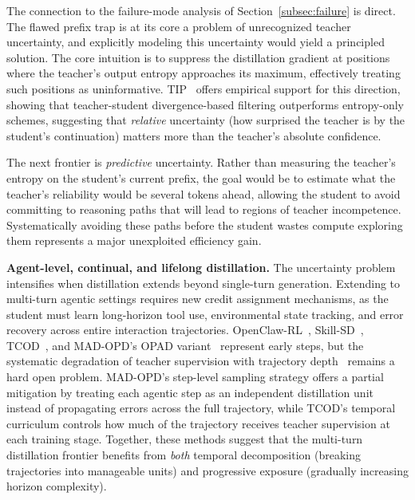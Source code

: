 \documentclass{article} %
\begin{document}
The connection to the failure-mode analysis of Section~\ref{subsec:failure} is direct. The flawed prefix trap is at its core a problem of unrecognized teacher uncertainty, and explicitly modeling this uncertainty would yield a principled solution. The core intuition is to suppress the distillation gradient at positions where the teacher's output entropy approaches its maximum, effectively treating such positions as uninformative. TIP~\citep{xu2026tip} offers empirical support for this direction, showing that teacher-student divergence-based filtering outperforms entropy-only schemes, suggesting that \emph{relative} uncertainty (how surprised the teacher is by the student's continuation) matters more than the teacher's absolute confidence.

The next frontier is \emph{predictive} uncertainty. Rather than measuring the teacher's entropy on the student's current prefix, the goal would be to estimate what the teacher's reliability would be several tokens ahead, allowing the student to avoid committing to reasoning paths that will lead to regions of teacher incompetence. Systematically avoiding these paths before the student wastes compute exploring them represents a major unexploited efficiency gain.

\textbf{Agent-level, continual, and lifelong distillation.} The uncertainty problem intensifies when distillation extends beyond single-turn generation. Extending to multi-turn agentic settings requires new credit assignment mechanisms, as the student must learn long-horizon tool use, environmental state tracking, and error recovery across entire interaction trajectories. OpenClaw-RL~\citep{wang2026openclawrl}, Skill-SD~\citep{wang2026skillsd}, TCOD~\citep{chen2026tcod}, and MAD-OPD's OPAD variant~\citep{wang2026madopd} represent early steps, but the systematic degradation of teacher supervision with trajectory depth~\citep{li2026rethinking} remains a hard open problem. MAD-OPD's step-level sampling strategy offers a partial mitigation by treating each agentic step as an independent distillation unit instead of propagating errors across the full trajectory, while TCOD's temporal curriculum controls how much of the trajectory receives teacher supervision at each training stage. Together, these methods suggest that the multi-turn distillation frontier benefits from \emph{both} temporal decomposition (breaking trajectories into manageable units) and progressive exposure (gradually increasing horizon complexity).
\end{document}
